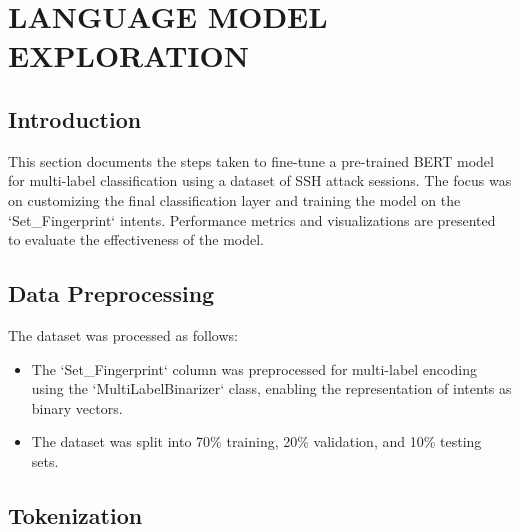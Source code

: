 

\section{LANGUAGE MODEL EXPLORATION}

    \subsection{Introduction}
    
        This section documents the steps taken to fine-tune a pre-trained BERT model for multi-label classification using a dataset of SSH attack sessions.
        The focus was on customizing the final classification layer and training the model on the `Set\_Fingerprint` intents. Performance metrics and visualizations are presented to evaluate the effectiveness of the model.

    \subsection{Data Preprocessing}
    
        The dataset was processed as follows:
        
        \begin{itemize}
        
            \item The `Set\_Fingerprint` column was preprocessed for multi-label encoding using the `MultiLabelBinarizer` class, enabling the representation of intents as binary vectors.
            
            \item The dataset was split into 70\% training, 20\% validation, and 10\% testing sets.
            
        \end{itemize}

    \subsection{Tokenization}
    

